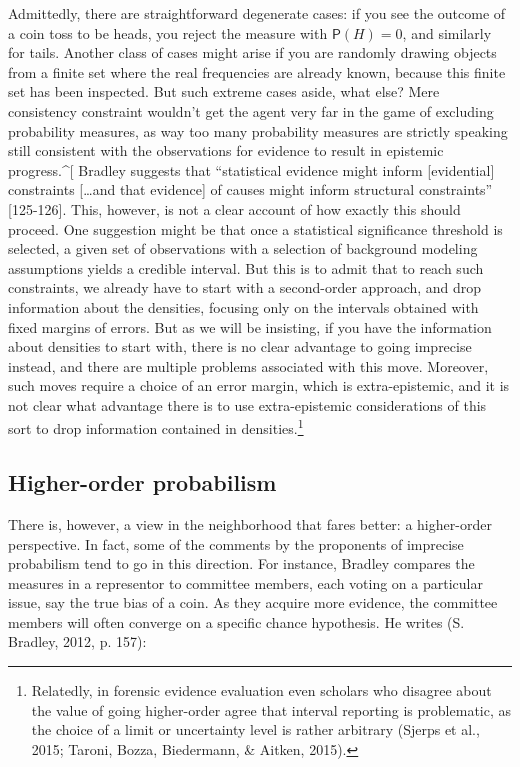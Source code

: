 \documentclass[
  10pt,
  dvipsnames,enabledeprecatedfontcommands]{scrartcl}
\begin{document}
Admittedly, there are straightforward degenerate cases: if you see the
outcome of a coin toss to be heads, you reject the measure with
\(\mathsf{P}(H)=0\), and similarly for tails. Another class of cases
might arise if you are randomly drawing objects from a finite set where
the real frequencies are already known, because this finite set has been
inspected. But such extreme cases aside, what else? Mere consistency
constraint wouldn't get the agent very far in the game of excluding
probability measures, as way too many probability measures are strictly
speaking still consistent with the observations for evidence to result
in epistemic progress.\^{}{[} Bradley suggests that ``statistical
evidence might inform {[}evidential{]} constraints {[}\dots and that
evidence{]} of causes might inform structural constraints''
{[}125-126{]}. This, however, is not a clear account of how exactly this
should proceed. One suggestion might be that once a statistical
significance threshold is selected, a given set of observations with a
selection of background modeling assumptions yields a credible interval.
But this is to admit that to reach such constraints, we already have to
start with a second-order approach, and drop information about the
densities, focusing only on the intervals obtained with fixed margins of
errors. But as we will be insisting, if you have the information about
densities to start with, there is no clear advantage to going imprecise
instead, and there are multiple problems associated with this move.
Moreover, such moves require a choice of an error margin, which is
extra-epistemic, and it is not clear what advantage there is to use
extra-epistemic considerations of this sort to drop information
contained in densities.\footnote{Relatedly, in forensic evidence
  evaluation even scholars who disagree about the value of going
  higher-order agree that interval reporting is problematic, as the
  choice of a limit or uncertainty level is rather arbitrary (Sjerps et
  al., 2015; Taroni, Bozza, Biedermann, \& Aitken, 2015).}

\hypertarget{higher-order-probabilism}{%
\subsection{Higher-order probabilism}\label{higher-order-probabilism}}

There is, however, a view in the neighborhood that fares better: a
higher-order perspective. In fact, some of the comments by the
proponents of imprecise probabilism tend to go in this direction. For
instance, Bradley compares the measures in a representor to committee
members, each voting on a particular issue, say the true bias of a coin.
As they acquire more evidence, the committee members will often converge
on a specific chance hypothesis. He writes (S. Bradley, 2012, p. 157):
\end{document}
